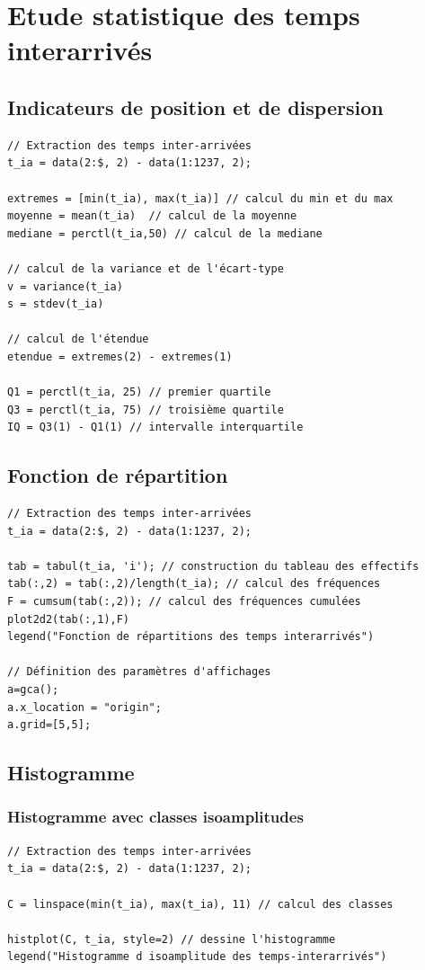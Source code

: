 \documentclass{article}
\begin{document}
\section{Etude statistique des temps interarrivés}

\subsection{Indicateurs de position et de dispersion}
\begin{verbatim}
// Extraction des temps inter-arrivées
t_ia = data(2:$, 2) - data(1:1237, 2);

extremes = [min(t_ia), max(t_ia)] // calcul du min et du max
moyenne = mean(t_ia)  // calcul de la moyenne
mediane = perctl(t_ia,50) // calcul de la mediane

// calcul de la variance et de l'écart-type
v = variance(t_ia)
s = stdev(t_ia)

// calcul de l'étendue
etendue = extremes(2) - extremes(1)

Q1 = perctl(t_ia, 25) // premier quartile
Q3 = perctl(t_ia, 75) // troisième quartile
IQ = Q3(1) - Q1(1) // intervalle interquartile
\end{verbatim}

\subsection{Fonction de répartition}
\begin{verbatim}
// Extraction des temps inter-arrivées
t_ia = data(2:$, 2) - data(1:1237, 2);

tab = tabul(t_ia, 'i'); // construction du tableau des effectifs
tab(:,2) = tab(:,2)/length(t_ia); // calcul des fréquences
F = cumsum(tab(:,2)); // calcul des fréquences cumulées
plot2d2(tab(:,1),F)
legend("Fonction de répartitions des temps interarrivés")

// Définition des paramètres d'affichages
a=gca();
a.x_location = "origin";
a.grid=[5,5];

\end{verbatim}

\subsection{Histogramme}
\subsubsection{Histogramme avec classes isoamplitudes}
\begin{verbatim}
// Extraction des temps inter-arrivées
t_ia = data(2:$, 2) - data(1:1237, 2);

C = linspace(min(t_ia), max(t_ia), 11) // calcul des classes

histplot(C, t_ia, style=2) // dessine l'histogramme
legend("Histogramme d isoamplitude des temps-interarrivés")
\end{verbatim}
\end{document}
